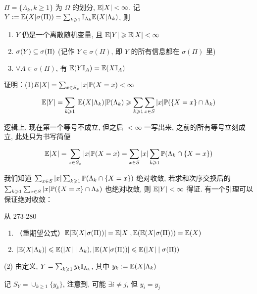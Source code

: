 \begin{theorem}\label{thm:partition_con_exp}
    $\Pi=\{\Lambda_k,k\geq 1\}$ 为 $\Omega$ 的划分,  $\mathbb E|X|<\infty$. 记 $Y:=\mathbb E(X|\sigma(\Pi))=\sum_{k\geqslant 1}\mathbb I_{\Lambda_k}\mathbb E(X|\Lambda_k)$, 则
    \begin{enumerate}
        \item $Y$ 仍是一个离散随机变量, 且 $\mathbb E|Y|\geqslant \mathbb E|X|<\infty$
        \item $\sigma(Y)\subseteq \sigma(\Pi)$ (记作 $Y\in \sigma(\Pi)$, 即 $Y$ 的所有信息都在 $\sigma(\Pi)$ 里)
        \item $\forall A\in \sigma(\Pi)$, 有 $\mathbb E(Y\mathbb I_A)=\mathbb E(X\mathbb I_A)$
    \end{enumerate}
\end{theorem}

证明：(1)$E|X|=\sum_{x\in S_x}|x|\mathbb{P}(X=x)<\infty$

\[
    \mathbb E|Y|=\sum_{k\geqslant 1}|\mathbb E(X|\Lambda_k)|\mathbb{P}(\Lambda_k)\geqslant \sum_{k\geqslant 1}\sum_{x\in S}|x|\mathbb{P}(\{X=x\}\cap \Lambda_k)
\]

逻辑上, 现在第一个等号不成立, 但之后 $<\infty$ 一写出来, 之前的所有等号立刻成立, 此处只为书写简便

\[
    \mathbb E|X|=\sum_{x\in S_x}|x|\mathbb{P}(X=x)=\sum_{x\in S}|x|\sum_{k\geqslant 1}\mathbb{P}(\Lambda_k\cap \{X=x\})
\]

我们知道 $\sum_{x\in S}|x|\sum_{k\geqslant 1}\mathbb{P}(\Lambda_k\cap \{X=x\})$ 绝对收敛, 若求和次序交换后的 $\sum_{k\geqslant 1}\sum_{x\in S}|x|\mathbb{P}(\{X=x\}\cap \Lambda_k)$ 也绝对收敛, 则 $\mathbb E|Y|<\infty$ 得证. 有一个引理可以保证绝对收敛：

\begin{lemma}\label{lem:abs_convergence}
    从 273-280
\end{lemma}

\begin{corollary}\label{cor:double_exp}
    \begin{enumerate}
        \item （重期望公式）$\mathbb E|\mathbb E(X|\sigma(\Pi))|=\mathbb E|X|, \mathbb E(\mathbb E(X|\sigma(\Pi)))=\mathbb E(X)$
        \item $|\mathbb E(X|\Lambda_k)|\leqslant \mathbb E(|X|\mid\Lambda_k), |\mathbb E(X|\sigma(\Pi))|\leqslant \mathbb E(|X|\mid\sigma(\Pi))$
    \end{enumerate}
\end{corollary}

(2) 由定义, $Y=\sum_{k\geqslant 1}y_k\mathbb I_{\Lambda_k}$, 其中 $y_k:=\mathbb E(X|\Lambda_k)$

记 $S_Y=\cup_{k\geq 1}\{y_k\}$, 注意到, 可能 $\exists i\neq j$, 但 $y_i=y_j$

